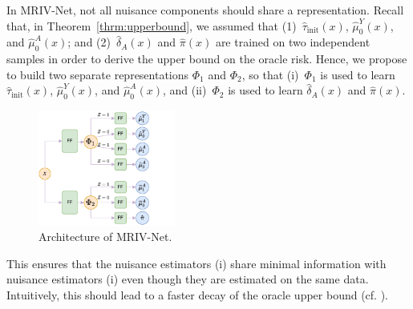\documentclass[nonatbib]{article}
\newcommand{\modelname}{\mbox{MRIV-Net}\xspace}
\theoremstyle{definition}
\theoremstyle{plain}
\begin{document}
In \modelname, not all nuisance components should share a representation. Recall that, in Theorem~\ref{thrm:upperbound}, we assumed that (1)~$\hat{\tau}_{\mathrm{init}}(x)$, $\hat{\mu}_0^Y(x)$, and $\hat{\mu}_0^A(x)$; and (2)~$\hat{\delta}_A(x)$ and $\hat{\pi}(x)$ are trained on two independent samples in order to derive the upper bound on the oracle risk. Hence, we propose to build two separate representations $\Phi_1$ and $\Phi_2$, so that (i)~$\Phi_1$ is used to learn $\hat{\tau}_{\mathrm{init}}(x)$, $\hat{\mu}_0^Y(x)$, and $\hat{\mu}_0^A(x)$, and (ii)~$\Phi_2$ is used to learn $\hat{\delta}_A(x)$ and $\hat{\pi}(x)$.  
\begin{figure}
\vspace{-0.5cm}
 \begin{center}
\includegraphics[width=0.4\textwidth]{img/mrnet}
\end{center}
\vspace{-0.5cm}
\caption{Architecture of \modelname.}
\label{fig:mrnet}
\end{figure}
This ensures that the nuisance estimators (i) share minimal information with nuisance estimators (i) even though they are estimated on the same data.
Intuitively, this should lead to a faster decay of the oracle upper bound (cf. \cite{Curth.2021}). 

\end{document}
